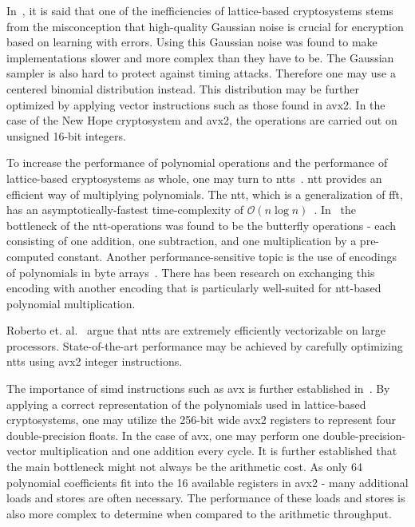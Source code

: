 
In~\cite{alkim2016}, it is said that one of the inefficiencies of lattice-based cryptosystems stems from the misconception that high-quality Gaussian noise is crucial for encryption based on learning with errors. Using this Gaussian noise was found to make implementations slower and more complex than they have to be. The Gaussian sampler is also hard to protect against timing attacks. Therefore one may use a centered binomial distribution instead. This distribution may be further optimized by applying vector instructions such as those found in \gls{avx2}. In the case of the New Hope cryptosystem and \gls{avx2}, the operations are carried out on unsigned 16-bit integers.

To increase the performance of polynomial operations and the performance of lattice-based cryptosystems as whole, one may turn to \glspl{ntt}~\cite{alkim2016}. \gls{ntt} provides an efficient way of multiplying polynomials. The \gls{ntt}, which is a generalization of \gls{fft}, has an asymptotically-fastest time-complexity of $\mathcal{O}(n\log{}n)$~\cite{roy2020}. In~\cite{alkim2016} the bottleneck of the \gls{ntt}-operations was found to be the butterfly operations - each consisting of one addition, one subtraction, and one multiplication by a pre-computed constant. Another performance-sensitive topic is the use of encodings of polynomials in byte arrays~\cite{alkim2016}. There has been research on exchanging this encoding with another encoding that is particularly well-suited for \gls{ntt}-based polynomial multiplication.

Roberto et. al.~\cite{kyber2021} argue that \glspl{ntt} are extremely efficiently vectorizable on large processors. State-of-the-art performance may be achieved by carefully optimizing \glspl{ntt} using \gls{avx2} integer instructions.

The importance of \gls{simd} instructions such as \gls{avx} is further established in~\cite{guneysu2013}. By applying a correct representation of the polynomials used in lattice-based cryptosystems, one may utilize the 256-bit wide \gls{avx2} registers to represent four double-precision floats. In the case of \gls{avx}, one may perform one double-precision-vector multiplication and one addition every cycle. It is further established that the main bottleneck might not always be the arithmetic cost. As only 64 polynomial coefficients fit into the 16 available registers in \gls{avx2} - many additional loads and stores are often necessary. The performance of these loads and stores is also more complex to determine when compared to the arithmetic throughput.


